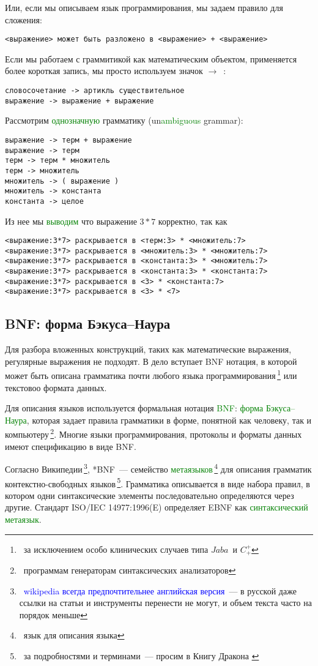 \documentclass[oneside,10pt]{article}
\renewcommand{\emph}[1]{\textcolor{blue}{#1}}
\newcommand{\note}[1]{\,\footnote{\ #1}}
\newcommand{\term}[1]{\textcolor{green}{#1}}
\newcommand{\cpp}{$C^+_+$}
\newcommand{\java}{$Jaba$}
\begin{document}
\clearpage
Или, если мы описываем язык программирования, мы задаем правило для сложения:
\begin{verbatim}
<выражение> может быть разложено в <выражение> + <выражение> 
\end{verbatim}

Если мы работаем с граммитикой как математическим объектом, применяется более
короткая запись, мы просто используем значок $\rightarrow$\ :
\begin{verbatim}
словосочетание -> артикль существительное
выражение -> выражение + выражение
\end{verbatim}

\clearpage
Рассмотрим \term{однозначную} грамматику (un\term{ambiguous} grammar):
\begin{verbatim}
выражение -> терм + выражение
выражение -> терм
терм -> терм * множитель
терм -> множитель
множитель -> ( выражение )
множитель -> константа
константа -> целое 
\end{verbatim}

Из нее мы \term{выводим} что выражение $3*7$ корректно, так как
\begin{verbatim}
<выражение:3*7> раскрывается в <терм:3> * <множитель:7>
<выражение:3*7> раскрывается в <множитель:3> * <множитель:7>
<выражение:3*7> раскрывается в <константа:3> * <множитель:7>
<выражение:3*7> раскрывается в <константа:3> * <константа:7>
<выражение:3*7> раскрывается в <3> * <константа:7>
<выражение:3*7> раскрывается в <3> * <7>
\end{verbatim}

\subsection{BNF: форма Бэкуса--Наура}

Для разбора вложенных конструкций, таких как математические выражения,
регулярные выражения не подходят. В дело вступает BNF нотация, в которой
может быть описана грамматика почти любого языка программирования\note{за
исключением особо клинических случаев типа \java\ и \cpp} или текстовоо формата
данных.

Для описания языков используется формальная нотация \term{BNF}: \term{форма
Бэ\-ку\-са--Наура}, которая задает правила грамматики в форме, понятной как
человеку, так и компьютеру\note{программам генераторам синтаксических
анализаторов}. Многие языки программирования, протоколы и форматы данных имеют
спецификацию в виде BNF.

\clearpage
Согласно Википедии\note{\emph{wikipedia всегда предпочтительнее английская
версия}\ --- в русской даже ссылки на статьи и инструменты перенести не могут, и
объем текста часто на порядок меньше}, *BNF\ --- семейство
\term{метаязыков}\note{язык для описания языка} для описания грамматик
контекстно-свободных языков\note{за подробностями и терминами\ --- просим в
Книгу Дракона \cite{dragon}}. Грамматика описывается в виде набора правил, в
котором одни синтаксические элементы последовательно определяются через другие.
Стандарт ISO/IEC 14977:1996(E) определяет EBNF как \term{синтаксический
метаязык}.
\end{document}
